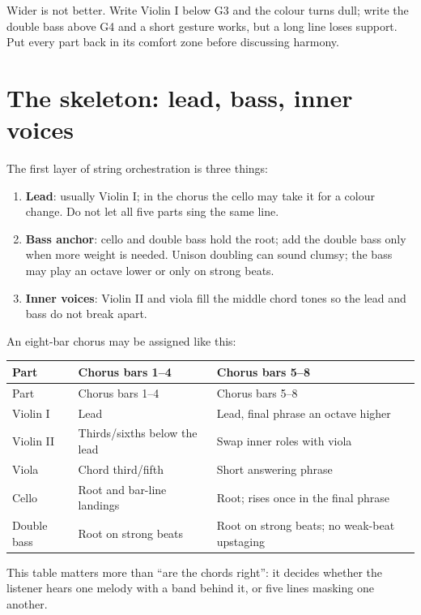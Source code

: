 Wider is not better. Write Violin I below G3 and the colour turns dull; write the double bass above G4 and a short gesture works, but a long line loses support. Put every part back in its comfort zone before discussing harmony.

\section{The skeleton: lead, bass, inner voices}
\label{sec:string-skeleton}

The first layer of string orchestration is three things:

\begin{enumerate}
\item \textbf{Lead}: usually Violin I; in the chorus the cello may take it for a colour change. Do not let all five parts sing the same line.
\item \textbf{Bass anchor}: cello and double bass hold the root; add the double bass only when more weight is needed. Unison doubling can sound clumsy; the bass may play an octave lower or only on strong beats.
\item \textbf{Inner voices}: Violin II and viola fill the middle chord tones so the lead and bass do not break apart.
\end{enumerate}

An eight-bar chorus may be assigned like this:

\begin{longtable}{p{}p{}p{}}
\toprule
Part & Chorus bars 1--4 & Chorus bars 5--8 \\
\midrule
\endfirsthead
\toprule
Part & Chorus bars 1--4 & Chorus bars 5--8 \\
\midrule
\endhead
Violin I & Lead & Lead, final phrase an octave higher \\
Violin II & Thirds/sixths below the lead & Swap inner roles with viola \\
Viola & Chord third/fifth & Short answering phrase \\
Cello & Root and bar-line landings & Root; rises once in the final phrase \\
Double bass & Root on strong beats & Root on strong beats; no weak-beat upstaging \\
\bottomrule
\end{longtable}

This table matters more than ``are the chords right'': it decides whether the listener hears one melody with a band behind it, or five lines masking one another.

